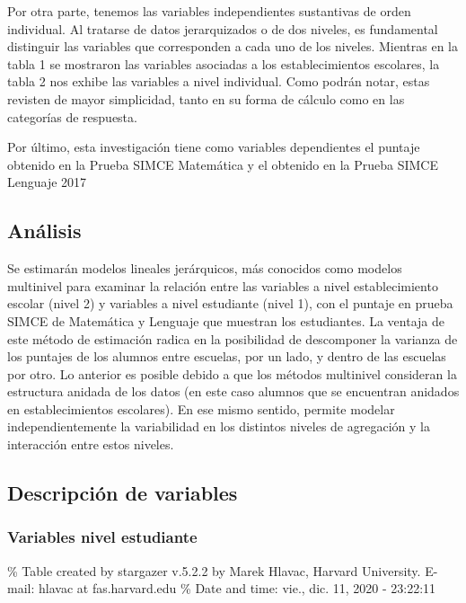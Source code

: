 \documentclass[
]{article}
\begin{document}
Por otra parte, tenemos las variables independientes sustantivas de
orden individual. Al tratarse de datos jerarquizados o de dos niveles,
es fundamental distinguir las variables que corresponden a cada uno de
los niveles. Mientras en la tabla 1 se mostraron las variables asociadas
a los establecimientos escolares, la tabla 2 nos exhibe las variables a
nivel individual. Como podrán notar, estas revisten de mayor
simplicidad, tanto en su forma de cálculo como en las categorías de
respuesta.

Por último, esta investigación tiene como variables dependientes el
puntaje obtenido en la Prueba SIMCE Matemática y el obtenido en la
Prueba SIMCE Lenguaje 2017

\hypertarget{anuxe1lisis}{%
\subsection{Análisis}\label{anuxe1lisis}}

Se estimarán modelos lineales jerárquicos, más conocidos como modelos
multinivel para examinar la relación entre las variables a nivel
establecimiento escolar (nivel 2) y variables a nivel estudiante (nivel
1), con el puntaje en prueba SIMCE de Matemática y Lenguaje que muestran
los estudiantes. La ventaja de este método de estimación radica en la
posibilidad de descomponer la varianza de los puntajes de los alumnos
entre escuelas, por un lado, y dentro de las escuelas por otro. Lo
anterior es posible debido a que los métodos multinivel consideran la
estructura anidada de los datos (en este caso alumnos que se encuentran
anidados en establecimientos escolares). En ese mismo sentido, permite
modelar independientemente la variabilidad en los distintos niveles de
agregación y la interacción entre estos niveles.

\hypertarget{descripciuxf3n-de-variables}{%
\subsection{Descripción de
variables}\label{descripciuxf3n-de-variables}}

\hypertarget{variables-nivel-estudiante}{%
\subsubsection{Variables nivel
estudiante}\label{variables-nivel-estudiante}}

\% Table created by stargazer v.5.2.2 by Marek Hlavac, Harvard
University. E-mail: hlavac at fas.harvard.edu \% Date and time: vie.,
dic. 11, 2020 - 23:22:11
\end{document}
